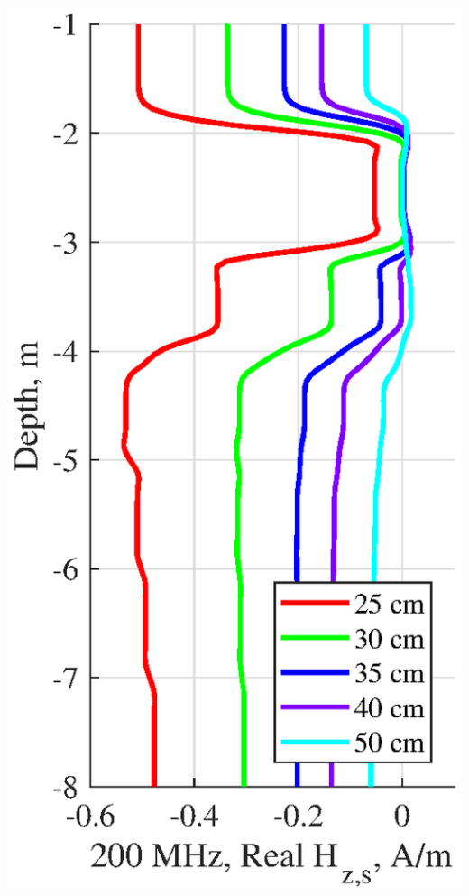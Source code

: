 \documentclass[aspectratio=169]{beamer}
\begin{document}
\begin{frame}
\begin{columns}[c]
\includegraphics[scale=0.44]{cement_solid_logg_Hre.eps}


\end{columns}
\end{frame}
\end{document}
